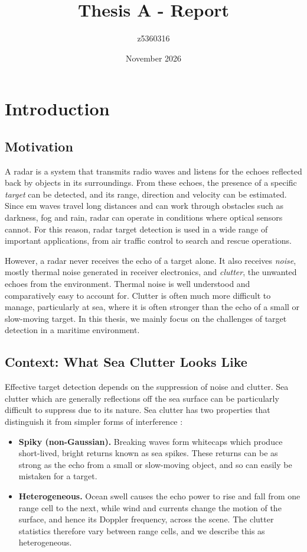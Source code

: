 \documentclass[12pt, a4paper]{report}
\title{Thesis A - Report}
\author{z5360316}
\date{November 2026}
\begin{document}




\printnoidxglossary[type=\acronymtype, title={List of Acronyms}, style=long, nogroupskip, nonumberlist]
\tableofcontents

\chapter{Introduction}\label{ch:intro}
\section{Motivation}
A radar is a system that transmits radio waves and listens for the echoes reflected back by objects in its surroundings. From these echoes, the presence of a specific \emph{target} can be detected, and its range, direction and velocity can be estimated. Since \gls{em} waves travel long distances and can work through obstacles such as darkness, fog and rain, radar can operate in conditions where optical sensors cannot. For this reason, radar target detection is used in a wide range of important applications, from air traffic control to search and rescue operations. 

However, a radar never receives the echo of a target alone. It also receives \emph{noise}, mostly thermal noise generated in receiver electronics, and \emph{clutter}, the unwanted echoes from the environment. Thermal noise is well understood and comparatively easy to account for. Clutter is often much more difficult to manage, particularly at sea, where it is often stronger than the echo of a small or slow-moving target. In this thesis, we mainly focus on the challenges of target detection in a maritime environment.

\section{Context: What Sea Clutter Looks Like}
Effective target detection depends on the suppression of noise and clutter. Sea clutter which are generally reflections off the sea surface can be particularly difficult to suppress due to its nature. Sea clutter has two properties that distinguish it from simpler forms of interference \cite{Rosenberg2017}:

\begin{itemize}
    \item \textbf{Spiky (non-Gaussian).} Breaking waves form whitecaps which produce short-lived, bright returns known as sea spikes. These returns can be as strong as the echo from a small or slow-moving object, and so can easily be mistaken for a target.
    \item \textbf{Heterogeneous.} Ocean swell causes the echo power to rise and fall from one range cell to the next, while wind and currents change the motion of the surface, and hence its Doppler frequency, across the scene. The clutter statistics therefore vary between range cells, and we describe this as heterogeneous.
\end{itemize}
\end{document}
